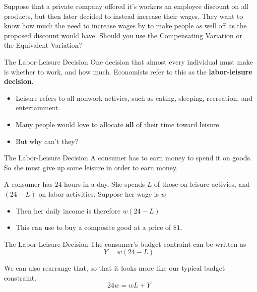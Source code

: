 \documentclass[11pt,t]{beamer}
\begin{document}
\begin{frame}
  
  \bigskip
  Suppose that a private company offered it's workers an employee discount on all products, but then later decided to instead increase their wages. They want to know how much the need to increase wages by to make people as well off as the proposed discount would have. Should you use the Compensating Variation or the Equivalent Variation?
\end{frame}

\begin{frame}{The Labor-Leisure Decision}
  One decision that almost every individual must make is whether to work, and how much. Economists refer to this as the \textbf{labor-leisure decision}. 

  \bigskip
  \begin{itemize}
    \item Leisure refers to all nonwork activies, such as eating, sleeping, recreation, and entertainment.

    \item Many people would love to allocate \textbf{all} of their time toward leisure.

    \item But why can't they?
  \end{itemize}
\end{frame}

\begin{frame}{The Labor-Leisure Decision}
  A consumer has to earn money to spend it on goods. So she must give up some leisure in order to earn money.

  \bigskip
  A consumer has $24$ hours in a day. She spends $L$ of those on leisure activies, and $(24 - L)$ on labor activities. Suppose her wage is $w$
  
  \bigskip
  \begin{itemize}
    \item Then her daily income is therefore $w(24-L)$ 

    \item This can use to buy a composite good at a price of $\$1$.
  \end{itemize}
\end{frame}

\begin{frame}{The Labor-Leisure Decision}
  The consumer's budget contraint can be written as
  $$
    Y = w (24 - L)
  $$

  \bigskip
  We can also rearrange that, so that it looks more like our typical budget constraint.
  $$
    24w = wL + Y
  $$
\end{frame}
\end{document}
